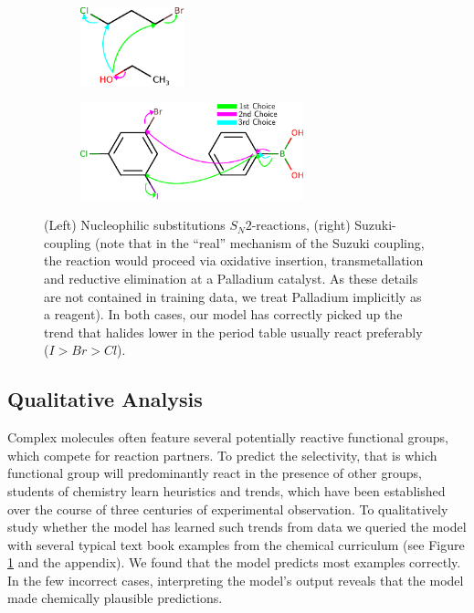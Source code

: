 
\begin{figure}[t]

    \centering
    \begin{subfigure}[b]{0.3\textwidth}
        \centering
        \includegraphics[height=0.9in]{imgs/textbook/reaction3}\\\vspace{0.1in}
    \end{subfigure}%
    \hspace{1cm}
     \begin{subfigure}[b]{0.5\textwidth}
        \centering
        \includegraphics[height=1.1in]{imgs/textbook/reaction7}
    \end{subfigure}
	\caption{(Left) Nucleophilic substitutions $S_N 2$-reactions, (right) Suzuki-coupling (note that in the ``real'' mechanism of the Suzuki coupling, the reaction would proceed via oxidative insertion, transmetallation and reductive elimination at a Palladium catalyst. As these details are not contained in training data, we treat Palladium implicitly as a reagent). 
    In both cases, our model has correctly picked up the trend that halides lower in the period table usually react preferably ($I>Br>Cl$). }
	\label{fig:qualitative}
\vspace{-0.5em}
\end{figure}



\subsection{Qualitative Analysis}

Complex molecules often feature several potentially reactive functional groups, which compete for reaction partners. 
To predict the selectivity, that is which functional group will predominantly react in the presence of other groups, 
students of chemistry learn heuristics and trends, 
which have been established over the course of three centuries of experimental observation.
To qualitatively study whether the model has learned such trends from data we queried the model with several typical text book examples from the chemical curriculum (see Figure \ref{fig:qualitative} and the appendix). 
We found that the model predicts most examples correctly. In the few incorrect cases, interpreting the model's output reveals that the model made chemically plausible predictions.

